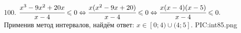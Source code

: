 100. $\cfrac{x^3-9x^2+20x}{x-4}\leqslant0\Leftrightarrow \cfrac{x(x^2-9x+20)}{x-4}\leqslant0\Leftrightarrow\cfrac{x(x-4)(x-5)}{x-4}\leqslant0.$ Применив метод интервалов, найдём ответ: $x\in[0;4)\cup(4;5].$
{{PIC:int85.png}}\\
